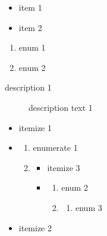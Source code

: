 
\begin{itemize}
    \item item 1
    \item item 2
\end{itemize}

\begin{enumerate}
    \item enum 1
    \item enum 2
\end{enumerate}

\begin{description}
    \item[description 1] description text 1
\end{description}

\begin{itemize}
    \item[!] itemize 1
    \item \begin{enumerate}
              \item enumerate 1
              \item \begin{itemize}
                        \item itemize 3
                        \item \begin{enumerate}
                                  \item enum 2
                                  \item \begin{enumerate}
                                            \item enum 3
                                  \end{enumerate}
                        \end{enumerate}
              \end{itemize}
    \end{enumerate}
    \item itemize 2
\end{itemize}
